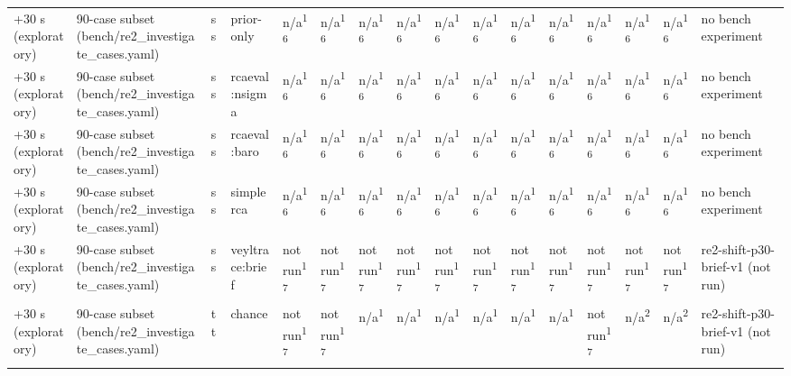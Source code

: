 \begin{table}[t]
\begin{tabular}{llllllllllllllll}
+30 s (exploratory) & 90-case subset (bench/re2\_investigate\_cases.yaml) & ss & prior-only & n/a\textsuperscript{16} & n/a\textsuperscript{16} & n/a\textsuperscript{16} & n/a\textsuperscript{16} & n/a\textsuperscript{16} & n/a\textsuperscript{16} & n/a\textsuperscript{16} & n/a\textsuperscript{16} & n/a\textsuperscript{16} & n/a\textsuperscript{16} & n/a\textsuperscript{16} & no bench experiment \\
+30 s (exploratory) & 90-case subset (bench/re2\_investigate\_cases.yaml) & ss & rcaeval:nsigma & n/a\textsuperscript{16} & n/a\textsuperscript{16} & n/a\textsuperscript{16} & n/a\textsuperscript{16} & n/a\textsuperscript{16} & n/a\textsuperscript{16} & n/a\textsuperscript{16} & n/a\textsuperscript{16} & n/a\textsuperscript{16} & n/a\textsuperscript{16} & n/a\textsuperscript{16} & no bench experiment \\
+30 s (exploratory) & 90-case subset (bench/re2\_investigate\_cases.yaml) & ss & rcaeval:baro & n/a\textsuperscript{16} & n/a\textsuperscript{16} & n/a\textsuperscript{16} & n/a\textsuperscript{16} & n/a\textsuperscript{16} & n/a\textsuperscript{16} & n/a\textsuperscript{16} & n/a\textsuperscript{16} & n/a\textsuperscript{16} & n/a\textsuperscript{16} & n/a\textsuperscript{16} & no bench experiment \\
+30 s (exploratory) & 90-case subset (bench/re2\_investigate\_cases.yaml) & ss & simplerca & n/a\textsuperscript{16} & n/a\textsuperscript{16} & n/a\textsuperscript{16} & n/a\textsuperscript{16} & n/a\textsuperscript{16} & n/a\textsuperscript{16} & n/a\textsuperscript{16} & n/a\textsuperscript{16} & n/a\textsuperscript{16} & n/a\textsuperscript{16} & n/a\textsuperscript{16} & no bench experiment \\
+30 s (exploratory) & 90-case subset (bench/re2\_investigate\_cases.yaml) & ss & veyltrace:brief & not run\textsuperscript{17} & not run\textsuperscript{17} & not run\textsuperscript{17} & not run\textsuperscript{17} & not run\textsuperscript{17} & not run\textsuperscript{17} & not run\textsuperscript{17} & not run\textsuperscript{17} & not run\textsuperscript{17} & not run\textsuperscript{17} & not run\textsuperscript{17} & re2-shift-p30-brief-v1 (not run) \\
+30 s (exploratory) & 90-case subset (bench/re2\_investigate\_cases.yaml) & tt & chance & not run\textsuperscript{17} & not run\textsuperscript{17} & n/a\textsuperscript{1} & n/a\textsuperscript{1} & n/a\textsuperscript{1} & n/a\textsuperscript{1} & n/a\textsuperscript{1} & n/a\textsuperscript{1} & not run\textsuperscript{17} & n/a\textsuperscript{2} & n/a\textsuperscript{2} & re2-shift-p30-brief-v1 (not run) \\

\end{tabular}
\end{table}

